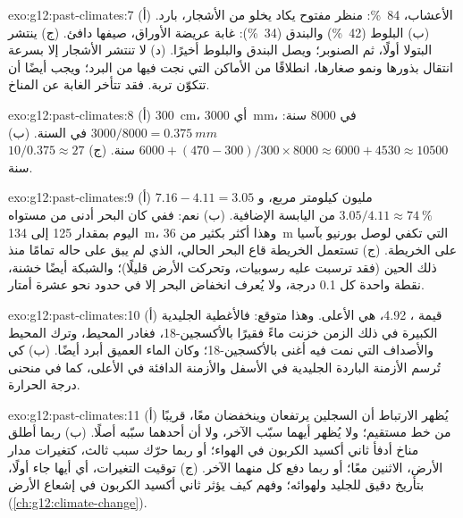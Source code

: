 \begin{solution}{exo:g12:past-climates:7}
(أ) الأعشاب، \qty{84}{\percent}: منظر مفتوح يكاد يخلو من الأشجار، بارد.
(ب) البلوط (\qty{42}{\percent}) والبندق (\qty{34}{\percent}): غابة عريضة
الأوراق، صيفها دافئ. (ج) ينتشر البتولا أولًا، ثم الصنوبر؛ ويصل البندق والبلوط
أخيرًا. (د) لا تنتشر الأشجار إلا بسرعة انتقال بذورها ونمو
صغارها، انطلاقًا من الأماكن التي نجت فيها من البرد؛ ويجب أيضًا أن تتكوّن
تربة. فقد تتأخر الغابة عن المناخ.
\end{solution}

\begin{solution}{exo:g12:past-climates:8}
(أ) \qty{300}{cm}، أي \qty{3000}{mm}، في \num{8000} سنة: $3000/8000 =
\qty{0.375}{mm}$ في السنة. (ب) $\num{6000} + (470 - 300)/300 \times \num{8000}
\approx \num{6000} + \num{4530} \approx \num{10500}$ سنة. (ج) $10/0.375
\approx 27$ سنة.
\end{solution}

\begin{solution}{exo:g12:past-climates:9}
(أ) $7.16 - 4.11 = 3.05$ مليون كيلومتر مربع، و$3.05/4.11 \approx
\qty{74}{\percent}$ من اليابسة الإضافية. (ب) نعم: ففي  كان البحر
أدنى من مستواه اليوم بمقدار 125 إلى \qty{134}{m}، وهذا أكثر بكثير من \qty{36}{m}
التي تكفي لوصل بورنيو بآسيا على الخريطة. (ج) تستعمل الخريطة قاع البحر الحالي، الذي لم
يبق على حاله تمامًا منذ ذلك الحين (فقد ترسبت عليه رسوبيات، وتحركت
الأرض قليلًا)؛ والشبكة أيضًا خشنة، نقطة واحدة كل 0.1
درجة، ولا يُعرف انخفاض البحر إلا في حدود نحو عشرة أمتار.
\end{solution}

\begin{solution}{exo:g12:past-climates:10}
(أ) قيمة ، \qty{4.92}{\permil}، هي
الأعلى. وهذا متوقع: فالأغطية الجليدية الكبيرة في ذلك الزمن خزنت ماءً فقيرًا
بالأكسجين-18، فغادر المحيط، وترك المحيط والأصداف التي نمت فيه أغنى
بالأكسجين-18؛ وكان الماء العميق أبرد أيضًا. (ب) كي تُرسم الأزمنة الباردة الجليدية
في الأسفل والأزمنة الدافئة في الأعلى، كما في منحنى درجة الحرارة.
\end{solution}

\begin{solution}{exo:g12:past-climates:11}
(أ) يُظهر الارتباط أن السجلين يرتفعان وينخفضان معًا، قريبًا
من خط مستقيم؛ ولا يُظهر أيهما سبّب الآخر، ولا أن أحدهما
سبّبه أصلًا. (ب) ربما أطلق مناخ أدفأ ثاني أكسيد الكربون في الهواء؛
أو ربما حرّك سبب ثالث، كتغيرات مدار الأرض،
الاثنين معًا؛ أو ربما دفع كل منهما الآخر. (ج) توقيت التغيرات، أي
أيها جاء أولًا، بتأريخ دقيق للجليد ولهوائه؛ وفهم
كيف يؤثر ثاني أكسيد الكربون في إشعاع الأرض
(\cref{ch:g12:climate-change}).
\end{solution}

